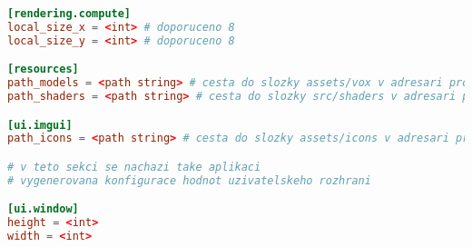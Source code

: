 \begin{lstlisting}[language=toml]
[rendering.compute]
local_size_x = <int> # doporuceno 8
local_size_y = <int> # doporuceno 8

[resources]
path_models = <path string> # cesta do slozky assets/vox v adresari projektu
path_shaders = <path string> # cesta do slozky src/shaders v adresari projektu

[ui.imgui]
path_icons = <path string> # cesta do slozky assets/icons v adresari projektu

# v teto sekci se nachazi take aplikaci
# vygenerovana konfigurace hodnot uzivatelskeho rozhrani

[ui.window]
height = <int>
width = <int>

\end{lstlisting}